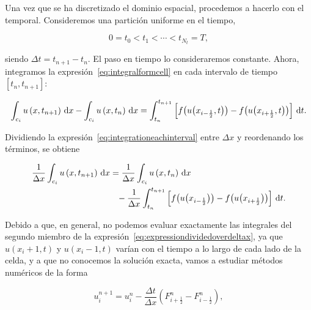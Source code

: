 Una vez que se ha discretizado el dominio espacial, procedemos a
hacerlo con el temporal.
Consideremos una partición uniforme en el tiempo,

\begin{equation*}
  0=t_{0}<
  t_{1}<
  \cdots<
  t_{N_{t}}=
  T,
\end{equation*}

siendo $\Delta t=t_{n+1}-t_{n}$.
El paso en tiempo lo consideraremos constante.
Ahora, integramos la expresión~\eqref{eq:integralformcell} en cada
intervalo de tiempo $\left[t_{n},t_{n+1}\right]$:

\begin{equation}\label{eq:integrationeachinterval}
  \int_{c_{i}}
  u\left(x,t_{n+1}\right)\dl x-
  \int_{c_{i}}
  u\left(x,t_{n}\right)\dl x=
  \int_{t_{n}}^{t_{n+1}}
  \left[
    f\big(u\big(x_{i-\frac{1}{2}},t\big)\big)-
    f\big(u\big(x_{i+\frac{1}{2}},t\big)\big)
    \right]
  \dl t.
\end{equation}

Dividiendo la expresión~\eqref{eq:integrationeachinterval} entre
$\Delta x$ y reordenando los términos, se obtiene

\begin{gather}\label{eq:expressiondividedoverdeltax}
  \begin{split}
    \frac{1}{\Delta x}
    \int_{c_{i}}
    u\left(x,t_{n+1}\right)\dl x
     & =
    \frac{1}{\Delta x}
    \int_{c_{i}}
    u\left(x,t_{n}\right)\dl x \\
     & \phantom{=}
    -\frac{1}{\Delta x}
    \int_{t_{n}}^{t_{n+1}}
    \left[
      f\big(u\big(x_{i-\frac{1}{2}}\big)\big)-
      f\big(u\big(x_{i+\frac{1}{2}}\big)\big)
      \right]\dl t.
  \end{split}
\end{gather}

Debido a que, en general, no podemos evaluar exactamente las
integrales del segundo miembro de la
expresión~\eqref{eq:expressiondividedoverdeltax}, ya que
\begin{math}
  u
  \left(x_{i}+1,t\right)
\end{math}
y
\begin{math}
  u
  \left(x_{i}-1,t\right)
\end{math}
varían con el
tiempo a lo largo de cada lado de la celda, y a que no conocemos la
solución exacta, vamos a estudiar métodos numéricos de la forma

\begin{equation}\label{eq:godunovscheme}
  u^{n+1}_{i}=
  u^{n}_{i}-
  \frac{\Delta t}{\Delta x}
  \left(
  F^{n}_{i+\frac{1}{2}}-
  F^{n}_{i-\frac{1}{2}}
  \right),
\end{equation}

